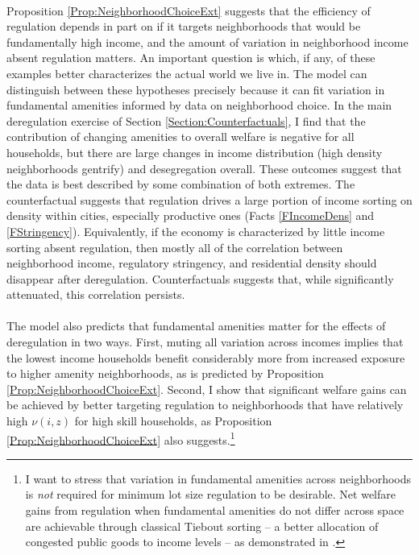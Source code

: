 \documentclass[12pt]{article}
\begin{document}
\paragraph*{}
Proposition \ref{Prop:NeighborhoodChoiceExt}  suggests that the efficiency of regulation depends in part on if it targets neighborhoods that would be fundamentally high income, and the amount of variation in neighborhood income absent regulation matters. An important question is which, if any, of these examples better characterizes the actual world we live in. The model can distinguish between these hypotheses precisely because it can fit variation in fundamental amenities informed by data on neighborhood choice. In the main deregulation exercise of Section \ref{Section:Counterfactuals}, I find that the contribution of changing amenities to overall welfare is negative for all households, but there are large changes in income distribution (high density neighborhoods gentrify) and desegregation overall. These outcomes suggest that the data is best described by some combination of both extremes. The counterfactual suggests that regulation drives a large portion of income sorting on density within cities, especially productive ones (Facts \ref{FIncomeDens} and \ref{FStringency}). Equivalently, if the economy is characterized by little income sorting absent regulation, then mostly all of the correlation between neighborhood income, regulatory stringency, and residential density should disappear after deregulation. Counterfactuals suggests that, while significantly attenuated, this correlation persists. 

\paragraph*{}
The model also predicts that fundamental amenities matter for the effects of deregulation in two ways. First, muting all variation across incomes implies that the lowest income households benefit considerably more from increased exposure to higher amenity neighborhoods, as is predicted by Proposition \ref{Prop:NeighborhoodChoiceExt}. Second, I show that significant welfare gains can be achieved by better targeting regulation to neighborhoods that have relatively high $\nu(i, z)$ for high skill households, as Proposition \ref{Prop:NeighborhoodChoiceExt} also suggests.\footnote{I want to stress that variation in fundamental amenities across neighborhoods is \textit{not} required for minimum lot size regulation to be desirable. Net welfare gains from regulation when fundamental amenities do not differ across space are achievable through classical Tiebout sorting -- a better allocation of congested public goods to income levels -- as demonstrated in \cite{calabresetal}.}
\end{document}
